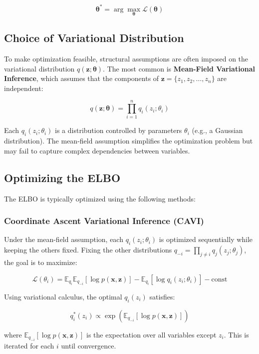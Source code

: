 \documentclass[10pt]{elegantbook}
\begin{document}
\[
\boldsymbol{\theta}^* = \arg\max_{\boldsymbol{\theta}} \mathcal{L}(\boldsymbol{\theta})
\]

\subsection{Choice of Variational Distribution}

To make optimization feasible, structural assumptions are often imposed on the variational distribution \( q(\mathbf{z}; \boldsymbol{\theta}) \). The most common is \textbf{Mean-Field Variational Inference}, which assumes that the components of \( \mathbf{z} = \{z_1, z_2, \dots, z_n\} \) are independent:

\[
q(\mathbf{z}; \boldsymbol{\theta}) = \prod_{i=1}^n q_i(z_i; \theta_i)
\]

Each \( q_i(z_i; \theta_i) \) is a distribution controlled by parameters \( \theta_i \) (e.g., a Gaussian distribution). The mean-field assumption simplifies the optimization problem but may fail to capture complex dependencies between variables.

\subsection{Optimizing the ELBO}

The ELBO is typically optimized using the following methods:

\subsubsection{Coordinate Ascent Variational Inference (CAVI)}

Under the mean-field assumption, each \( q_i(z_i; \theta_i) \) is optimized sequentially while keeping the others fixed. Fixing the other distributions \( q_{-i} = \prod_{j \neq i} q_j(z_j; \theta_j) \), the goal is to maximize:

\[
\mathcal{L}(\theta_i) = \mathbb{E}_{q_i} \mathbb{E}_{q_{-i}} [\log p(\mathbf{x}, \mathbf{z})] - \mathbb{E}_{q_i} [\log q_i(z_i; \theta_i)] - \text{const}
\]

Using variational calculus, the optimal \( q_i(z_i) \) satisfies:

\[
q_i^*(z_i) \propto \exp \left( \mathbb{E}_{q_{-i}} [\log p(\mathbf{x}, \mathbf{z})] \right)
\]

where \( \mathbb{E}_{q_{-i}} [\log p(\mathbf{x}, \mathbf{z})] \) is the expectation over all variables except \( z_i \). This is iterated for each \( i \) until convergence.
\end{document}
